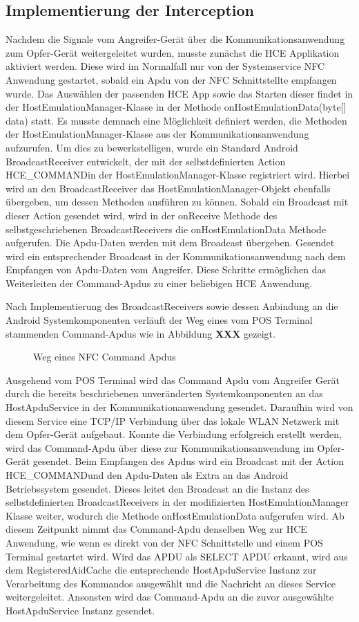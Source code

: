 \subsection{Implementierung der Interception}

Nachdem die Signale vom Angreifer-Gerät über die Kommunikationsanwendung zum Opfer-Gerät weitergeleitet wurden, musste zunächst die HCE Applikation aktiviert werden. Diese wird im Normalfall nur von der Systemservice NFC Anwendung gestartet, sobald ein Apdu von der NFC Schnittstellte empfangen wurde. Das Auswählen der passenden HCE App sowie das Starten dieser findet in der HostEmulationManager-Klasse in der Methode onHostEmulationData(byte[] data) statt. Es musste demnach eine Möglichkeit definiert werden, die Methoden der HostEmulationManager-Klasse aus der Kommunikationsanwendung aufzurufen. Um dies zu bewerkstelligen, wurde ein Standard Android BroadcastReceiver entwickelt, der mit der selbstdefinierten Action \glqq HCE\_COMMAND\grqq in der HostEmulationManager-Klasse registriert wird. Hierbei wird an den BroadcastReceiver das HostEmulationManager-Objekt ebenfalls übergeben, um dessen Methoden ausführen zu können. Sobald ein Broadcast mit dieser Action gesendet wird, wird in der onReceive Methode des selbstgeschriebenen BroadcastReceivers die onHostEmulationData Methode aufgerufen. Die Apdu-Daten werden mit dem Broadcast übergeben. 
Gesendet wird ein entsprechender Broadcast in der Kommunikationsanwendung nach dem Empfangen von Apdu-Daten vom Angreifer. Diese Schritte ermöglichen das Weiterleiten der Command-Apdus zu einer beliebigen HCE Anwendung. 

Nach Implementierung des BroadcastReceivers sowie dessen Anbindung an die Android Systemkomponenten verläuft der Weg eines vom POS Terminal stammenden Command-Apdus wie in Abbildung \textbf{XXX} gezeigt. 

\begin{figure}
	\caption{Weg eines NFC Command Apdus}
\end{figure}

Ausgehend vom POS Terminal wird das Command Apdu vom Angreifer Gerät durch die bereits beschriebenen unveränderten Systemkomponenten an das HostApduService in der Kommunikationanwendung gesendet. Daraufhin wird von diesem Service eine TCP/IP Verbindung über das lokale WLAN Netzwerk mit dem Opfer-Gerät aufgebaut. Konnte die Verbindung erfolgreich erstellt werden, wird das Command-Apdu über diese zur Kommunikationsanwendung im Opfer-Gerät gesendet. Beim Empfangen des Apdus wird ein Broadcast mit der Action \glqq HCE\_COMMAND\grqq und den Apdu-Daten als Extra an das Android Betriebssystem gesendet. Dieses leitet den Broadcast an die Instanz des selbstdefinierten BroadcastReceivers in der modifizierten HostEmulationManager Klasse weiter, wodurch die Methode onHostEmulationData aufgerufen wird. Ab diesem Zeitpunkt nimmt das Command-Apdu denselben Weg zur HCE Anwendung, wie wenn es direkt von der NFC Schnittstelle und einem POS Terminal gestartet wird. Wird das APDU als SELECT APDU erkannt, wird aus dem RegisteredAidCache die entsprechende HostApduService Instanz zur Verarbeitung des Kommandos ausgewählt und die Nachricht an dieses Service weitergeleitet. Ansonsten wird das Command-Apdu an die zuvor ausgewählte HostApduService Instanz gesendet. 

